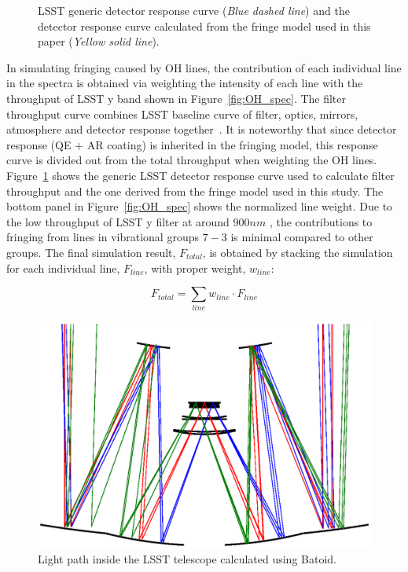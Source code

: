 \documentclass[twocolumn]{aastex63} %
\begin{document}
\begin{CJK*}{UTF8}{gbsn}
\begin{figure}[htb]
\centering
{}
\caption{LSST generic detector response curve ({\it Blue dashed line}) and the detector response curve calculated from the fringe model used in this paper ({\it Yellow solid line}).}
\label{fig:det_response}
\end{figure}


In simulating fringing caused by OH lines, the contribution of each individual line in the spectra is obtained via weighting the intensity of each line with the throughput of LSST y band shown in Figure~\ref{fig:OH_spec}. The filter throughput curve combines LSST baseline curve of filter, optics, mirrors, atmosphere and detector response together~\citep{Ivezi19}. It is noteworthy that since detector response (QE $+$ AR coating) is inherited in the fringing model, this response curve is divided out from the total throughput when weighting the OH lines. Figure~\ref{fig:det_response} shows the generic LSST detector response curve used to calculate filter throughput and the one derived from the fringe model used in this study. The bottom panel in Figure~\ref{fig:OH_spec} shows the normalized line weight. Due to the low throughput of LSST y filter at around $900nm$ , the contributions to fringing from lines in vibrational groups $7-3$ is minimal compared to other groups. The final simulation result, $F_{total}$, is obtained by stacking the simulation for each individual line, $F_{line}$, with proper weight, $w_{line}$:

\begin{equation*}
    F_{total} = \sum_{line}w_{line}\cdot F_{line}
\end{equation*}

\begin{figure}[t]
\centering
\includegraphics[scale = 0.4]{light_tracing.eps}
\caption{Light path inside the LSST telescope calculated using Batoid.}
\label{fig:batoid-light-tracing}
\end{figure}



\end{CJK*}
\end{document}
